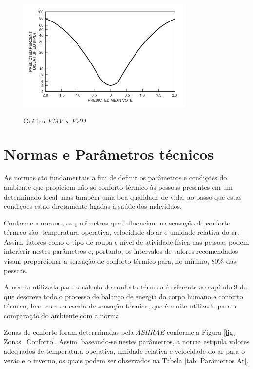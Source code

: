 \documentclass[acronym,symbols,table]{fei}
\begin{document}
\begin{figure}[!htp] 
 \centering
    \caption{Gráfico \textit{PMV} x \textit{PPD}}
    \includegraphics[width=0.6\linewidth]{Imagens/grafico-pmv-ppd.jpeg}
    \label{fig:graficopmvppd}
\end{figure}

\section{Normas e Parâmetros técnicos} \label{premissas}

As normas são fundamentais a fim de definir os parâmetros e condições do ambiente que propiciem não só conforto térmico às pessoas presentes em um determinado local, mas também uma boa qualidade de vida, ao passo que estas condições estão diretamente ligadas à saúde dos indivíduos.

Conforme a norma \textcite{abnt216401}, os parâmetros que influenciam na sensação de conforto térmico são: temperatura operativa, velocidade do ar e umidade relativa do ar. Assim, fatores como o tipo de roupa e nível de atividade física das pessoas podem interferir nestes parâmetros e, portanto, os intervalos de valores recomendados visam proporcionar a sensação de conforto térmico para, no mínimo, $80\%$ das pessoas.

A norma utilizada para o cálculo do conforto térmico é referente ao capítulo 9 da \textcite{ASHRAE2009} que descreve todo o processo de balanço de energia do corpo humano e conforto térmico, bem como a escala de sensação térmica, que é muito utilizada para a comparação do ambiente com a norma. 

Zonas de conforto foram determinadas pela \textit{ASHRAE} conforme a Figura \ref{fig: Zonas_Conforto}. Assim, baseando-se nestes parâmetros, a norma \textcite{abnt216401} estipula valores adequados de temperatura operativa, umidade relativa e velocidade do ar para o verão e o inverno, os quais podem ser observados na Tabela \ref{tab: Parâmetros Ar}. 
\end{document}
